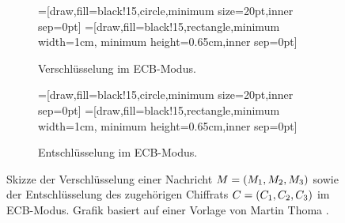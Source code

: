 \begin{figure}[h]
  \centering
  \begin{subfigure}[h]{.45\textwidth}
    \centering
    =[draw,fill=black!15,circle,minimum size=20pt,inner sep=0pt]
    =[draw,fill=black!15,rectangle,minimum width=1cm, minimum height=0.65cm,inner sep=0pt]
    \caption{Verschlüsselung im ECB-Modus.}
  \end{subfigure}
  \hfill
  \begin{subfigure}[h]{.45\textwidth}
    \centering
    =[draw,fill=black!15,circle,minimum size=20pt,inner sep=0pt]
    =[draw,fill=black!15,rectangle,minimum width=1cm, minimum height=0.65cm,inner sep=0pt]
    \caption{Entschlüsselung im ECB-Modus.}
  \end{subfigure}
  \caption{Skizze der Verschlüsselung einer Nachricht $M =
    (M_{1},M_{2},M_{3})$ sowie der Entschlüsselung des
    zugehörigen Chiffrats $C =
    (C_{1},C_{2},C_{3})$ im ECB-Modus. Grafik
    basiert auf einer Vorlage von Martin Thoma \cite{Thoma2013}.} 
\end{figure}

